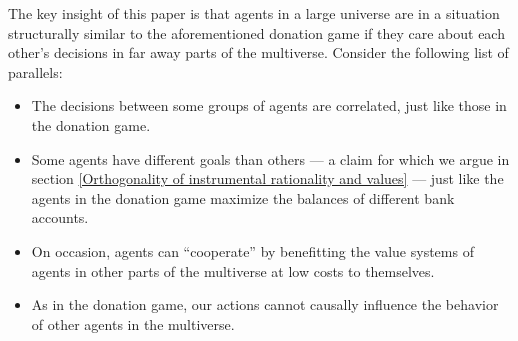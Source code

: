 \documentclass{book}
\begin{document}
The key insight of this paper is that agents in a large universe are in a situation structurally similar to the aforementioned donation game if they care about each other's decisions in far away parts of the multiverse. Consider the following list of parallels:
\begin{itemize}
	\item The decisions between some groups of agents are correlated, just like those in the donation game.
	\item Some agents have different goals than others --- a claim for which we argue in section \ref{Orthogonality of instrumental rationality and values} --- just like the agents in the donation game maximize the balances of different bank accounts.
	\item On occasion, agents can “cooperate” by benefitting the value systems of agents in other parts of the multiverse at low costs to themselves.
	\item As in the donation game, our actions cannot causally influence the behavior of other agents in the multiverse.
\end{itemize}
 
\end{document}
